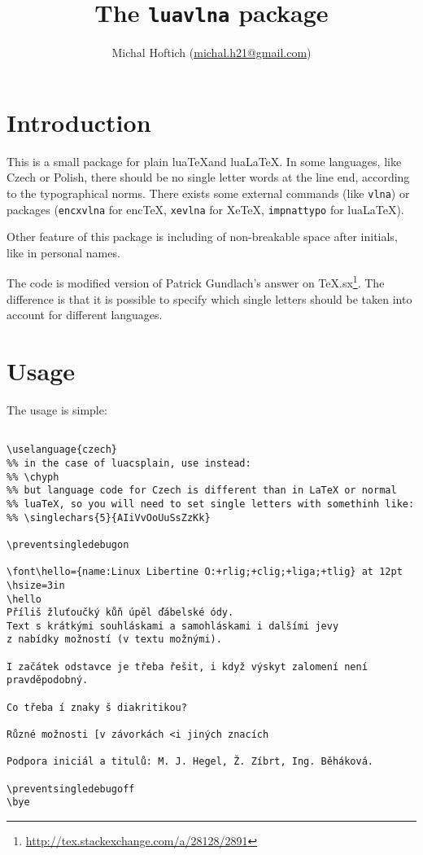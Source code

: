 \documentclass[12pt]{ltxdoc}
\begin{document}
\title{The \verb|luavlna| package}
\author{Michal Hoftich (\url{michal.h21@gmail.com})}
\maketitle
\tableofcontents
\section{Introduction}


This is a small package for plain lua\TeX and lua\LaTeX. In some languages, like
Czech or Polish, there should be no single letter words at the line
end, according to the typographical norms. There exists some
external commands (like \verb!vlna!) or packages (\verb!encxvlna!
for enc\TeX, \verb!xevlna! for Xe\TeX,
\verb!impnattypo! for lua\LaTeX). %

Other feature of this package is including of non-breakable space after 
initials, like in personal names. 

The code is modified version of Patrick Gundlach's answer on
TeX.sx\footnote{\url{http://tex.stackexchange.com/a/28128/2891}}.
The difference is that it is possible to specify which single letters
should be taken into account for different languages.


\section{Usage}

The usage is simple:

\begin{verbatim}

\uselanguage{czech}
%% in the case of luacsplain, use instead:
%% \chyph
%% but language code for Czech is different than in LaTeX or normal 
%% luaTeX, so you will need to set single letters with somethinh like:
%% \singlechars{5}{AIiVvOoUuSsZzKk}

\preventsingledebugon

\font\hello={name:Linux Libertine O:+rlig;+clig;+liga;+tlig} at 12pt 
\hsize=3in
\hello
Příliš žluťoučký kůň úpěl ďábelské ódy. 
Text s krátkými souhláskami a samohláskami i dalšími jevy 
z nabídky možností (v textu možnými). 

I začátek odstavce je třeba řešit, i když výskyt zalomení není pravděpodobný.

Co třeba í znaky š diakritikou?

Různé možnosti [v závorkách <i jiných znacích

Podpora iniciál a titulů: M. J. Hegel, Ž. Zíbrt, Ing. Běháková.

\preventsingledebugoff
\bye
\end{verbatim}
\end{document}
